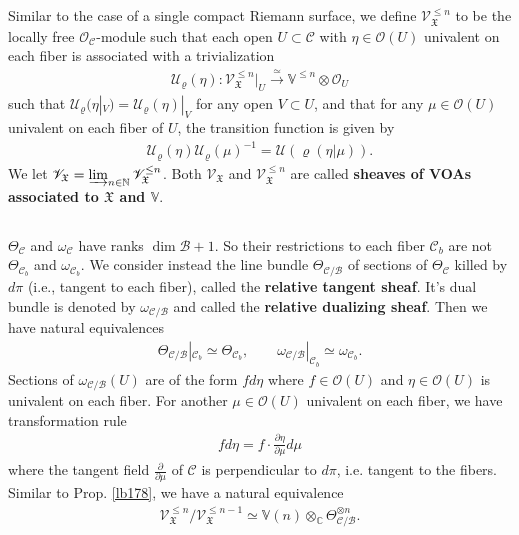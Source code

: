 \documentclass[11pt,b5paper,notitlepage]{article}
\theoremstyle{definition}
\theoremstyle{plain}
\newcommand{\fk}{\mathfrak}
\newcommand{\mc}{\mathcal}
\newcommand{\scr}{\mathscr}
\newcommand{\Vbb}{\mathbb V}
\newcommand{\Cbb}{\mathbb C}
\newcommand{\Nbb}{\mathbb N}
\numberwithin{equation}{section}
\begin{document}
Similar to the case of a single compact Riemann surface, we define $\scr V^{\leq n}_{\fk X}$ \index{VX@$\scr V^{\leq n}_{\fk X},\scr V_{\fk X}$} to be the locally free $\scr O_{\mc C}$-module such that each open $U\subset\mc C$ with $\eta\in\scr O(U)$ univalent on each fiber is associated with a trivialization \index{U@$\mc U_\varrho(\eta)$}
\begin{align}
\mc U_\varrho(\eta):\scr V^{\leq n}_{\fk X}|_U\xrightarrow{\simeq}\Vbb^{\leq n}\otimes\scr O_U
\end{align}
such that $\mc U_\varrho(\eta|_V)=\mc U_\varrho(\eta)|_V$ for any open $V\subset U$, and that for any $\mu\in\scr O(U)$ univalent on each fiber of $U$, the transition function is given by
\begin{align}
\mc U_\varrho(\eta)\mc U_\varrho(\mu)^{-1}=\mc U(\varrho(\eta|\mu)).
\end{align}
We let $\scr V_{\fk X}=\varinjlim_{n\in\Nbb}\scr V_{\fk X}^{\leq n}$. Both $\scr V_{\fk X}$ and $\scr V_{\fk X}^{\leq n}$ are called \textbf{sheaves of VOAs associated to $\fk X$ and $\Vbb$}.





\subsection{}


$\Theta_{\mc C}$ and $\omega_{\mc C}$ have ranks $\dim\mc B+1$. So their restrictions to each fiber $\mc C_b$ are not $\Theta_{\mc C_b}$ and $\omega_{\mc C_b}$. We consider instead the line bundle $\Theta_{\mc C/\mc B}$ \index{zz@$\Theta_{\mc C/\mc B}$} of sections of $\Theta_{\mc C}$ killed by $d\pi$ (i.e., tangent to each fiber), called the \textbf{relative tangent sheaf}. It's dual bundle is denoted by $\omega_{\mc C/\mc B}$ \index{zz@$\omega_{\mc C/\mc B}$} and called the \textbf{relative dualizing sheaf}. Then we have natural equivalences
\begin{align}
\Theta_{\mc C/\mc B}|_{\mc C_b}\simeq\Theta_{\mc C_b},\qquad \omega_{\mc C/\mc B}|_{\mc C_b}\simeq\omega_{\mc C_b}.
\end{align}
Sections of $\omega_{\mc C/\mc B}(U)$ are of the form $fd\eta$ where $f\in\scr O(U)$ and $\eta\in\scr O(U)$ is univalent on each fiber. For another $\mu\in\scr O(U)$ univalent on each fiber, we have transformation rule
\begin{align}
fd\eta=f\cdot\frac{\partial\eta}{\partial\mu}d\mu
\end{align}
where the tangent field $\frac{\partial}{\partial\mu}$ of $\mc C$ is perpendicular to $d\pi$, i.e. tangent to the fibers. Similar to Prop. \ref{lb178}, we have a natural equivalence
\begin{align}
\scr V_{\fk X}^{\leq n}/\scr V_{\fk X}^{\leq n-1}\simeq \Vbb(n)\otimes_\Cbb\Theta_{\mc C/\mc B}^{\otimes n}.
\end{align}
\end{document}
